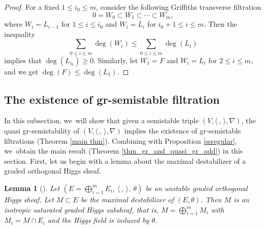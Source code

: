 \documentclass[11pt]{article}
\numberwithin{equation}{section}
\newcommand{\grsemistable}{gr\nobreakdash-semi\-stable\xspace}
\theoremstyle{plain}
\newtheorem{lem}[thm]{Lemma}
\theoremstyle{definition}
\begin{document}
\begin{proof}
For a fixed $1\leq i_0\leq m$, consider the following Griffiths transverse filtration
\[
0=W_0\subset W_1\subset \cdots\subset W_m,
\]
where $W_i= L_{i-1}$ for $1\leq i\leq i_0$ and $W_i= L_i$ for $i_0+1\leq i\leq m$. Then the inequality
\[
\sum_{0\leq i\leq m}\deg(W_i)\leqslant\sum_{0\leq i\leq m}\deg(L_i)
\]
implies that $\deg(L_{i_0})\geq 0$. Similarly, let $W_1=F$ and $W_i=L_i$ for $2\leq i\leq m$, and we get $\deg(F)\leq \deg(L_1)$.
\end{proof} 

\subsection{The existence of \texorpdfstring{\protect\grsemistable}{grsemistable} filtration}\label{subsect_exist}

In this subsection, we~will show that given a semistable triple $(V, \langle \,, \, \rangle, \nabla)$, the quasi gr-semistability of $(V, \langle \,, \, \rangle, \nabla)$ implies the existence of \grsemistable filtrations (Theorem \ref{main thm}). Combining with Proposition \ref{ssregular}, we~obtain the main result (Theorem \ref{thm_gr_and_quasi_gr_odd}) in this section. First, let us begin with a lemma about the maximal destabilizer of a graded orthogonal Higgs sheaf.

\begin{lem}[{\cite[Lem.\,A.6]{LSZ19}}]\label{destabilizer}
Let $(E=\mathop{\bigoplus}_{i=1}^{m} E_i,\ \langle \,, \, \rangle,\ \theta)$ be an unstable graded orthogonal Higgs sheaf. Let $M\subset E$ be the maximal destabilizer of $(E,\theta)$. Then $M$ is an isotropic saturated graded Higgs subsheaf, that is, $M=\mathop{\bigoplus}_{i=1}^{m} M_i$ with $M_i=M\cap E_i$ and the Higgs field is induced by $\theta$.
\end{lem}
\end{document}
